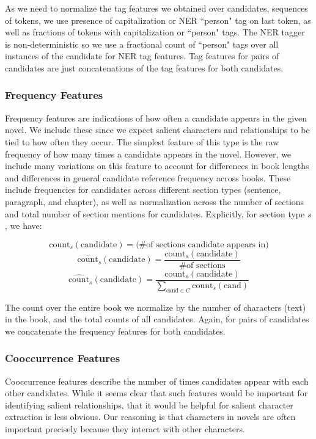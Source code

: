 \documentclass[12pt]{article}
\begin{document}
        As we need to normalize the tag features we obtained over candidates, sequences of tokens,
        we use presence of capitalization or NER ``person" tag on last token, as well as fractions
        of tokens with capitalization or ``person" tags. The NER tagger is non-deterministic so
        we use a fractional count of ``person" tags over all instances of the candidate for NER
        tag features. Tag features for pairs of candidates are just concatenations of the tag
        features for both candidates.

        \subsubsection{Frequency Features}

        Frequency features are indications of how often a candidate appears in the given novel. We include 
        these since we expect salient characters and relationships to be tied to how often they occur. 
        The simplest feature of this type is the raw frequency of how many times a candidate
        appears in the novel. However, we include many variations on this feature to account for
        differences in book lengths and differences in general candidate reference frequency across books.
        These include frequencies for candidates across different section types (sentence, paragraph, and chapter), as well
        as normalization across the number of sections and total number of section mentions for candidates.
        Explicitly, for section type $s$, we have:
        
        \[\mbox{count}_s(\mbox{candidate}) = \mbox{(\# of sections candidate appears in)}\]
        \[\overline{\mbox{count}}_s(\mbox{candidate}) = \frac{\mbox{count}_s(\mbox{candidate})}{\mbox{\# of sections}}\]
        \[\hat{\mbox{count}}_s(\mbox{candidate}) = \frac{\mbox{count}_s(\mbox{candidate})}{\sum_{\mbox{cand}\in{C}}\mbox{count}_s(\mbox{cand})}\]

        The count over the entire book we normalize by the number of characters (text) in the book, and the total
        counts of all candidates. Again, for pairs of candidates we concatenate the frequency features for both
        candidates.

        \subsubsection{Cooccurrence Features}

        Cooccurrence features describe the number of times candidates appear with each other candidates. 
        While it seems clear that such features would be important for identifying salient relationships,
        that it would be helpful for salient character extraction is less obvious. Our reasoning is that 
        characters in novels are often important precisely because they interact with other
        characters. \\
\end{document}
